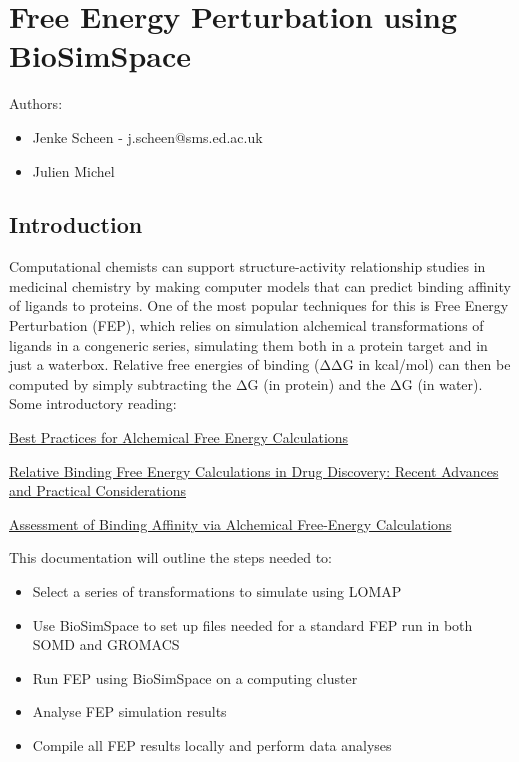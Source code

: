 \hypertarget{free-energy-perturbation-using-biosimspace}{%
\section{Free Energy Perturbation using
BioSimSpace}\label{free-energy-perturbation-using-biosimspace}}

Authors:

\begin{itemize}
\tightlist
\item
  Jenke Scheen - j.scheen@sms.ed.ac.uk
\item
  Julien Michel
\end{itemize}

\hypertarget{introduction}{%
\subsection{Introduction}\label{introduction}}

Computational chemists can support structure-activity relationship
studies in medicinal chemistry by making computer models that can
predict binding affinity of ligands to proteins. One of the most popular
techniques for this is Free Energy Perturbation (FEP), which relies on
simulation alchemical transformations of ligands in a congeneric series,
simulating them both in a protein target and in just a waterbox.
Relative free energies of binding (ΔΔG in kcal/mol) can then be computed
by simply subtracting the ΔG (in protein) and the ΔG (in water). Some
introductory reading:

\href{https://www.livecomsjournal.org/article/18378-best-practices-for-alchemical-free-energy-calculations-article-v1-0}{Best
Practices for Alchemical Free Energy Calculations}

\href{https://pubs.acs.org/doi/10.1021/acs.jcim.7b00564}{Relative
Binding Free Energy Calculations in Drug Discovery: Recent Advances and
Practical Considerations}

\href{https://pubs.acs.org/doi/10.1021/acs.jcim.0c00165}{Assessment of
Binding Affinity via Alchemical Free-Energy Calculations}

This documentation will outline the steps needed to:

\begin{itemize}
\tightlist
\item
  Select a series of transformations to simulate using LOMAP
\item
  Use BioSimSpace to set up files needed for a standard FEP run in both
  SOMD and GROMACS
\item
  Run FEP using BioSimSpace on a computing cluster
\item
  Analyse FEP simulation results
\item
  Compile all FEP results locally and perform data analyses
\end{itemize}

